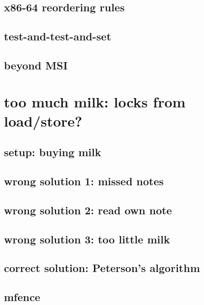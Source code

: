 \subsection{x86-64 reordering rules}




\subsection{test-and-test-and-set}




\subsection{beyond MSI}

\section{too much milk: locks from load/store?}

\subsection{setup: buying milk}


\subsection{wrong solution 1: missed notes}


\subsection{wrong solution 2: read own note}


\subsection{wrong solution 3: too little milk}


\subsection{correct solution: Peterson's algorithm}


\subsection{mfence}


